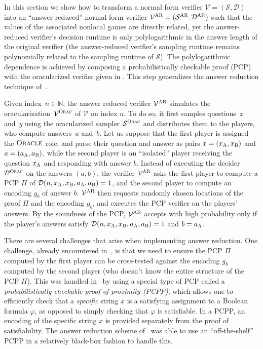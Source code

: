 \documentclass[11pt]{article}
\theoremstyle{definition}
\newcommand{\N}{\ensuremath{\mathbb{N}}}
\newcommand{\sampler}{\mathcal{S}}
\newcommand{\decider}{\mathcal{D}}
\newcommand{\verifier}{\mathcal{V}}
\newcommand{\gamestyle}[1]{\ensuremath{\textsc{#1}}\xspace}
\newcommand{\ora}{\gamestyle{Orac}}
\newcommand{\ar}{\gamestyle{AR}}
\newcommand{\labelstyle}[1]{\ensuremath{\textsc{#1}}\xspace}
\newcommand{\alice}{\labelstyle{A}}
\newcommand{\bob}{\labelstyle{B}}
\newcommand{\oracle}{\labelstyle{Oracle}}
\begin{document}
In this section we show how to transform a normal form verifier $\verifier =
(\sampler, \decider)$ into an ``answer reduced'' normal form verifier
$\verifier^\ar = (\sampler^\ar, \decider^\ar)$ such that the values of the
associated nonlocal games are directly related, yet the answer-reduced
verifier's decision runtime is only polylogarithmic in the answer length of the
original verifier (the answer-reduced verifier's sampling runtime remains
polynomially related to the sampling runtime of $\sampler$).
The polylogarithmic dependence is achieved by composing a probabilistically
checkable proof (PCP) with the oracularized verifier given in .
This step generalizes the answer reduction technique of~\cite[Part V]{NW19}.

Given index~$n \in \N$, the answer reduced verifier $\verifier^\ar$ simulates
the oracularization~$\verifier^\ora$ of $\verifier$ on index $n$.
To do so, it first samples questions~$x$ and~$y$ using the oracularized sampler
$\sampler^\ora$ and distributes them to the players, who compute answers~$a$
and~$b$.
Let us suppose that the first player is assigned the $\oracle$ role, and parse
their question and answer as pairs $x = (x_\alice, x_\bob)$ and $a = (a_\alice,
a_\bob)$, while the second player is an ``isolated'' player receiving the
question $x_\alice$ and responding with answer $b$.
Instead of executing the decider $\decider^\ora$ on the answers $(a, b)$, the
verifier $\verifier^\ar$ asks the first player to compute a PCP $\Pi$ of
$\decider(n, x_\alice, x_\bob, a_\alice, a_\bob) = 1$, and the second player to
compute an encoding $g_b$ of answer $b$.
$\verifier^\ar$ then requests randomly chosen locations of the proof $\Pi$ and
the encoding $g_b$, and executes the PCP verifier on the players' answers.
By the soundness of the PCP, $\verifier^\ar$ accepts with high probability only
if the player's answers satisfy $\decider(n, x_\alice, x_\bob, a_\alice, a_\bob)
= 1$ and $b = a_\alice$.

There are several challenges that arise when implementing answer reduction.
One challenge, already encountered in~\cite{NW19}, is that we need to ensure the
PCP $\Pi$ computed by the first player can be cross-tested against the encoding
$g_b$ computed by the second player (who doesn't know the entire structure of
the PCP $\Pi$).
This was handled in~\cite{NW19} by using a special type of PCP called a
\emph{probabilistically checkable proof of proximity (PCPP)}, which allows one
to efficiently check that a \emph{specific} string $x$ is a satisfying
assignment to a Boolean formula $\varphi$, as opposed to simply checking that
$\varphi$ is satisfiable.
In a PCPP, an encoding of the specific string $x$ is provided separately from
the proof of satisfiability.
The answer reduction scheme of~\cite{NW19} was able to use an ``off-the-shelf''
PCPP in a relatively black-box fashion to handle this.
\end{document}
